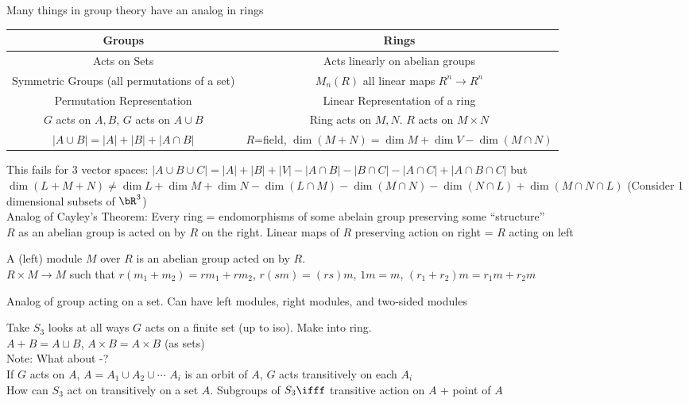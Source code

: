 \noindent
Many things in group theory have an analog in rings 
\begin{tabular}{c|c}
    Groups & Rings \\ \hline 
    Acts on Sets & Acts linearly on abelian groups \\ 
    Symmetric Groups (all permutations of a set) & $M_n(R)$ all linear maps $R^n \to R^n$ \\ 
    Permutation Representation & Linear Representation of a ring \\ 
    $G$ acts on $A,B$, $G$ acts on $A \cup B$ & Ring acts on $M, N$. $R$ acts on $M \times N$ \\
    $|A \cup B| = |A| + |B| + |A \cap B|$ & $R$=field, $\dim(M +N) = \dim M + \dim V - \dim(M \cap N)$
\end{tabular}
This fails for 3 vector spaces: $|A \cup B \cup C| = |A| + |B| + |V| - |A \cap B| - |B \cap C| - |A \cap C| + |A \cap B \cap C|$ but \\
$\dim (L + M + N) \neq \dim L + \dim M + \dim N - \dim(L \cap M) - \dim(M \cap N) - \dim (N \cap L) + \dim(M \cap N \cap L)$ (Consider 1 dimensional subsets of $\bR^3$) \\

\noindent
Analog of Cayley's Theorem: Every ring = endomorphisms of some abelain group preserving some ``structure'' \\ 
$R$ as an abelian group is acted on by $R$ on the right. Linear maps of $R$ preserving action on right = $R$ acting on left 

\begin{definition}
    A (left) module $M$ over $R$ is an abelian group acted on by $R$. \\
    $R \times M \to M$ such that $r(m_1 + m_2) = rm_1 +rm_2$, $r(sm) = (rs)m$, $1m = m$, $(r_1 + r_2)m = r_1m + r_2m$ 
\end{definition}

\noindent
Analog of group acting on a set. Can have left modules, right modules, and two-sided modules 

\begin{example}
    Take $S_3$ looks at all ways $G$ acts on a finite set (up to iso). Make into ring. \\
    $A +B = A \sqcup B$, $A \times B = A \times B$ (as sets) \\
    Note: What about -? \\
    If $G$ acts on $A$, $A = A_1 \cup A_2 \cup \cdots$ $A_i$ is an orbit of $A$, $G$ acts transitively on each $A_i$ \\
    How can $S_3$ act on transitively on a set $A$. Subgroups of $S_3 \ifff$ transitive action on $A$ + point of $A$
\end{example}

